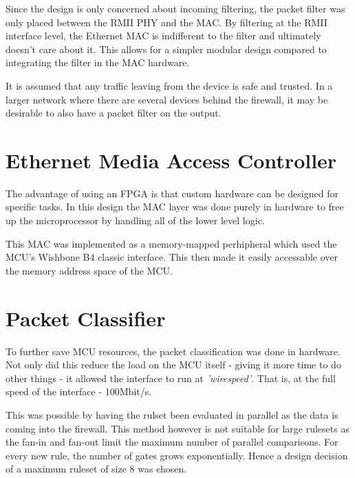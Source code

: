 Since the design is only concerned about incoming filtering, the packet filter was only placed between the RMII PHY and the MAC. By filtering at the RMII interface level, the Ethernet MAC is indifferent to the filter and ultimately doesn't care about it. This allows for a simpler modular design compared to integrating the filter in the MAC hardware.

It is assumed that any traffic leaving from the device is safe and trusted. In a larger network where there are several devices behind the firewall, it may be desirable to also have a packet filter on the output. 










\section{Ethernet Media Access Controller}
\label{sec:ethernet_mac}
The advantage of using an FPGA is that custom hardware can be designed for specific tasks. In this design the MAC layer was done purely in hardware to free up the microprocessor by handling all of the lower level logic. 

This MAC was implemented as a memory-mapped perhipheral which used the MCU's Wishbone B4 classic interface. This then made it easily accessable over the memory address space of the MCU.  









\section{Packet Classifier}
\label{sec:packet_classifier}
To further save MCU resources, the packet classification was done in hardware. Not only did this reduce the load on the MCU itself - giving it more time to do other things - it allowed the interface to run at \textit{'wirespeed'}. That is, at the full speed of the interface - 100Mbit/s. 

This was possible by having the rulset been evaluated in parallel as the data is coming into the firewall. This method however is not suitable for large rulesets as the fan-in and fan-out limit the maximum number of parallel comparisons. For every new rule, the number of gates grows exponentially. Hence a design decision of a maximum ruleset of size 8 was chosen. 

